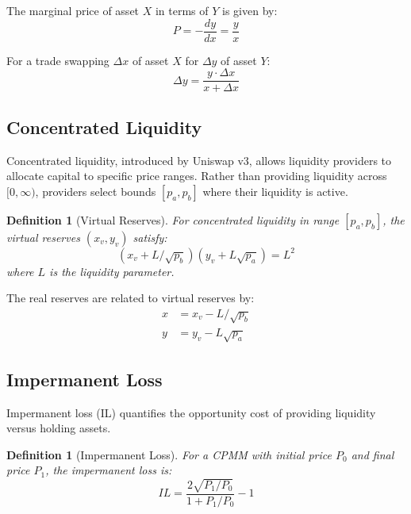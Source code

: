 \documentclass[11pt,a4paper]{article}
\newtheorem{definition}[theorem]{Definition}
\begin{document}
The marginal price of asset $X$ in terms of $Y$ is given by:
\begin{equation}
    P = -\frac{dy}{dx} = \frac{y}{x}
\end{equation}

For a trade swapping $\Delta x$ of asset $X$ for $\Delta y$ of asset $Y$:
\begin{equation}
    \Delta y = \frac{y \cdot \Delta x}{x + \Delta x}
\end{equation}

\subsection{Concentrated Liquidity}

Concentrated liquidity, introduced by Uniswap v3, allows liquidity providers to allocate capital to specific price ranges. Rather than providing liquidity across $[0, \infty)$, providers select bounds $[p_a, p_b]$ where their liquidity is active.

\begin{definition}[Virtual Reserves]
For concentrated liquidity in range $[p_a, p_b]$, the virtual reserves $(x_v, y_v)$ satisfy:
\begin{equation}
    (x_v + L/\sqrt{p_b})(y_v + L\sqrt{p_a}) = L^2
\end{equation}
where $L$ is the liquidity parameter.
\end{definition}

The real reserves are related to virtual reserves by:
\begin{align}
    x &= x_v - L/\sqrt{p_b} \\
    y &= y_v - L\sqrt{p_a}
\end{align}

\subsection{Impermanent Loss}

Impermanent loss (IL) quantifies the opportunity cost of providing liquidity versus holding assets.

\begin{definition}[Impermanent Loss]
For a CPMM with initial price $P_0$ and final price $P_1$, the impermanent loss is:
\begin{equation}
    IL = \frac{2\sqrt{P_1/P_0}}{1 + P_1/P_0} - 1
\end{equation}
\end{definition}
\end{document}
